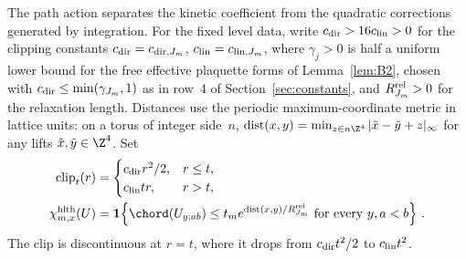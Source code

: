 The path action separates the kinetic coefficient from the quadratic corrections generated by integration. For the fixed level data, write $c_{\rm dir}>16c_{\rm lin}>0$ for the clipping constants $c_{\rm dir}=c_{{\rm dir},J_m}$, $c_{\rm lin}=c_{{\rm lin},J_m}$, where $\gamma_j>0$ is half a uniform lower bound for the free effective plaquette forms of Lemma~\ref{lem:B2}, chosen with $c_{\rm dir}\le\min(\gamma_{J_m},1)$ as in row~4 of Section~\ref{sec:constants}, and $R_{J_m}^{\rm rel}>0$ for the relaxation length. Distances use the periodic maximum-coordinate metric in lattice units: on a torus of integer side~$n$, $\operatorname{dist}(x,y)=\min_{z\in n\Z^4}|\tilde x-\tilde y+z|_\infty$ for any lifts $\tilde x,\tilde y\in\Z^4$. Set
\begin{align}\label{eq:I12-clipping}
\operatorname{clip}_{t}(r)&=
\begin{cases}c_{\rm dir}r^2/2,&r\le t,\\c_{\rm lin}tr,&r>t,\end{cases}\notag\\
\chi^{\rm hlth}_{m,x}(U)&=\mathbf1\!\left\{
\chord(U_{y;ab})\le t_m e^{\operatorname{dist}(x,y)/R_{J_m}^{\rm rel}}
\text{ for every }y,a<b\right\}\,.
\end{align}
The clip is discontinuous at $r=t$, where it drops from $c_{\rm dir}t^2/2$ to $c_{\rm lin}t^2$.


